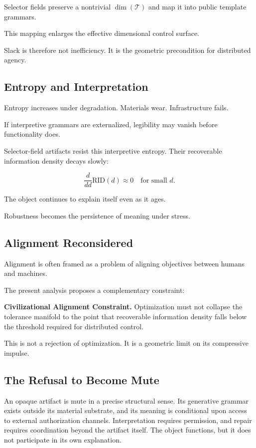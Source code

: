 \documentclass[11pt]{article}
\begin{document}
Selector fields preserve a nontrivial $\dim(\mathcal{T})$
and map it into public template grammars.

This mapping enlarges the effective dimensional control surface.

Slack is therefore not inefficiency.
It is the geometric precondition for distributed agency.

\subsection{Entropy and Interpretation}

Entropy increases under degradation.
Materials wear.
Infrastructure fails.

If interpretive grammars are externalized,
legibility may vanish before functionality does.

Selector-field artifacts resist this interpretive entropy.
Their recoverable information density decays slowly:

\[
\frac{d}{dd} \text{RID}(d) \approx 0 \quad \text{for small } d.
\]

The object continues to explain itself
even as it ages.

Robustness becomes the persistence of meaning under stress.

\subsection{Alignment Reconsidered}

Alignment is often framed as a problem of
aligning objectives between humans and machines.

The present analysis proposes a complementary constraint:

\medskip

\noindent
\textbf{Civilizational Alignment Constraint.}
Optimization must not collapse the tolerance manifold
to the point that recoverable information density
falls below the threshold required for distributed control.

\medskip

This is not a rejection of optimization.
It is a geometric limit on its compressive impulse.

\subsection{The Refusal to Become Mute}

An opaque artifact is mute in a precise structural sense. Its
generative grammar exists outside its material substrate, and its
meaning is conditional upon access to external authorization channels.
Interpretation requires permission, and repair requires coordination
beyond the artifact itself. The object functions, but it does not
participate in its own explanation.
\end{document}

